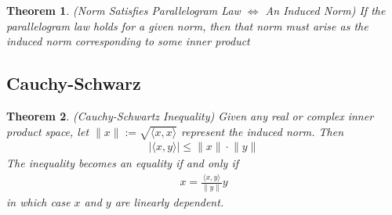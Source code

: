 \documentclass[12pt]{book}
\numberwithin{equation}{section} %
\theoremstyle{plain}
\newtheorem{thm}{Theorem}[section]
\theoremstyle{definition}
\theoremstyle{remark}
\begin{document}
\begin{thm}
\label{thm:parallelogram}
\emph{(Norm Satisfies Parallelogram Law $\iff$ An Induced Norm)}
If the parallelogram law holds for a given norm, then that norm
must arise as the induced norm corresponding to some inner product
\end{thm}



\clearpage
\subsection{Cauchy-Schwarz}

\begin{thm}
\label{thm.cauchyscwarz}
\emph{(Cauchy-Schwartz Inequality)}
Given any real or complex inner product space, let
$\lVert x\rVert := \sqrt{\langle x,x\rangle}$ represent the induced
norm.  Then
\begin{align*}
  \lvert \langle x,y\rangle\rvert \leq \lVert x\rVert\cdot\lVert y\rVert
\end{align*}
The inequality becomes an equality if and only if
\begin{align*}
  x = \frac{\langle x,y\rangle}{\lVert y\rVert}y
\end{align*}
in which case $x$ and $y$ are linearly dependent.
\end{thm}
\end{document}
